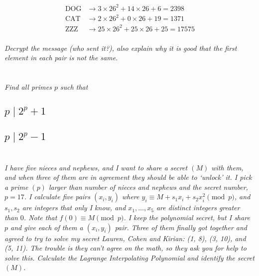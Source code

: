 \documentclass[12pt]{article}
\begin{document}
    \begin{align*}
        \text{DOG} &\to 3  \times 26^2 + 14 \times 26 + 6  = 2398\\
        \text{CAT} &\to 2  \times 26^2 + 0  \times 26 + 19 = 1371\\
        \text{ZZZ} &\to 25 \times 26^2 + 25 \times 26 + 25 = 17575\\
    \end{align*}

\textit{Decrypt the message (who sent it?), also explain why it is good that the first element in each pair is not the same.}

\newpage

\section{} \textit{Find all primes $p$ such that}

    \subsection{$p \mid 2^p + 1$}

    \subsection{$p \mid 2^p - 1$}

\newpage

\section{} \textit{I have five nieces and nephews, and I want to share a secret $(M)$ with them, and when three of them are in agreement they should be able to `unlock' it. I pick a prime $(p)$ larger than number of nieces and nephews and the secret number, $p = 17$. I calculate five pairs $(x_i, y_i)$ where $y_i \equiv M + s_1 x_i + s_2 x_i ^ 2\pmod{p}$, and $s_1, s_2$ are integers that only I know, and $x_1, \dots, x_5$ are distinct integers greater than $0$. Note that $f(0) \equiv M \pmod{p}$. I keep the polynomial secret, but I share $p$ and give each of them a $(x_i, y_i)$ pair. Three of them finally got together and agreed to try to solve my secret Lauren, Cohen and Kirian: (1, 8), (3, 10), and (5, 11). The trouble is they can't agree on the math, so they ask you for help to solve this. Calculate the Lagrange Interpolating Polynomial and identify the secret $(M)$.}
\end{document}
